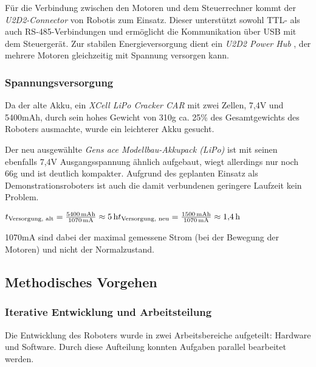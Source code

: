 Für die Verbindung zwischen den Motoren und dem Steuerrechner kommt der \textit{U2D2-Connector} von Robotis \cite{robotis_u2d2} zum Einsatz. Dieser unterstützt sowohl TTL- als auch RS-485-Verbindungen und ermöglicht die Kommunikation über USB mit dem Steuergerät. Zur stabilen Energieversorgung dient ein \textit{U2D2 Power Hub} \cite{robotis_u2d2_power_hub}, der mehrere Motoren gleichzeitig mit Spannung versorgen kann.


\subsubsection{Spannungsversorgung}

Da der alte Akku, ein \textit{XCell LiPo Cracker CAR} \cite{xcell_akku} mit zwei Zellen, 7,4V und 5400mAh, durch sein hohes Gewicht von 310g ca. 25\% des Gesamtgewichts des Roboters ausmachte, wurde ein leichterer Akku gesucht.

Der neu ausgewählte \textit{Gens ace Modellbau-Akkupack (LiPo)} \cite{gens_ace_akku} ist mit seinen ebenfalls 7,4V Ausgangsspannung ähnlich aufgebaut, wiegt allerdings nur noch 66g und ist deutlich kompakter. Aufgrund des geplanten Einsatz als Demonstrationsroboters ist auch die damit verbundenen geringere Laufzeit kein Problem. 

$t_{\text{Versorgung, alt}} = \frac{5400\,\mathrm{mAh}}{1070\,\mathrm{mA}} \approx 5\,\mathrm{h} \newline
\newline
t_{\text{Versorgung, neu}} = \frac{1500\,\mathrm{mAh}}{1070\,\mathrm{mA}} \approx 1{,}4\,\mathrm{h}$

1070mA sind dabei der maximal gemessene Strom (bei der Bewegung der Motoren) und nicht der Normalzustand.


\subsection{Methodisches Vorgehen}

\subsubsection{Iterative Entwicklung und Arbeitsteilung}

Die Entwicklung des Roboters wurde in zwei Arbeitsbereiche aufgeteilt: Hardware und Software. Durch diese Aufteilung konnten Aufgaben parallel bearbeitet werden.

